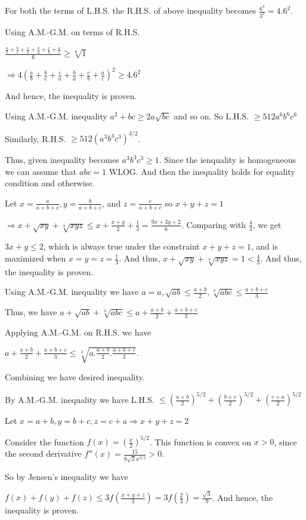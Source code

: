  For both the terms of L.H.S. the R.H.S. of above inequality becomes $\frac{6^4}{3^2} = 4.6^2$.

  Using A.M.-G.M. on terms of R.H.S.

  $\displaystyle \frac{\frac{a}{b} + \frac{b}{c} + \frac{c}{a} + \frac{b}{a} + \frac{c}{b}
    + \frac{a}{c}}{6}\geq \sqrt[6]{1}$

  $\Rightarrow 4\left(\frac{a}{b} + \frac{b}{c} + \frac{c}{a} + \frac{b}{a} + \frac{c}{b}
  + \frac{a}{c}\right)^2\geq 4.6^2$

  And hence, the inequality is proven.
\item Using A.M.-G.M. inequality $a^2 + bc\geq 2a\sqrt{bc}$ and so on. So L.H.S. $\geq512a^6b^6c^6$

  Similarly, R.H.S. $\geq 512 (a^3b^3c^3)^{3/2}$.

  Thus, given inequality becomes $a^3b^3c^3\geq 1$. Since the ienquality is homogeneous we can assume that
  $abc = 1$ WLOG. And then the inequality holds for equality condition and otherwise.
\item Let $x = \frac{a}{a+ b + c}, y = \frac{b}{a + b + c}$, and $z = \frac{c}{a + b + c}$ so $x + y + z =
  1$

  $\Rightarrow x + \sqrt{xy} + \sqrt[3]{xyz} \leq x + \frac{x + y}{2} + \frac{1}{3} = \frac{9x + 3y +
    2}{6}$. Comparing with $\frac{4}{3}$, we get

  $3x + y\leq 2$, which is always true under the constraint $x + y + z = 1$, and is maximized when $x = y =
  z = \frac{1}{3}$. And thus, $x + \sqrt{xy} + \sqrt[3]{xyz} = 1 < \frac{4}{3}$. And thus, the inequality is
  proven.
\item Using A.M.-G.M. inequality we have $a = a, \sqrt{ab}\leq \frac{a + b}{2}, \sqrt[3]{abc}\leq \frac{a +
  b + c}{3}$

  Thus, we have $a + \sqrt{ab} + \sqrt[3]{abc}\leq a + \frac{a + b}{2} + \frac{a + b + c}{3}$

  Applying A.M.-G.M. on R.H.S. we have

  $a + \frac{a + b}{2} + \frac{a + b + c}{3}\leq \sqrt[3]{a.\frac{a + b}{2}.\frac{a + b + c}{3}}$.

  Combining we have desired inequality.
\item By A.M.-G.M. inequality we have L.H.S. $\leq \left(\frac{a + b}{2}\right)^{5/2} + \left(\frac{b +
  c}{2}\right)^{5/2} + \left(\frac{c + a}{2}\right)^{5/2}$

  Let $x = a + b, y = b + c, z = c + a\Rightarrow x + y + z = 2$

  Consider the function $f(x) = \left(\frac{x}{2}\right)^{5/2}$. This function is convex on $x > 0$, since
  the second derivative $f''(x) = \frac{15}{8\sqrt{2}x^{3/2}}> 0$.

  So by Jensen's inequality we have

  $f(x) + f(y) + f(z)\leq 3f\left(\frac{x + y + z}{3}\right) = 3f\left(\frac{2}{3}\right)
  = \frac{\sqrt{3}}{9}$. And hence, the inequality is proven.
\stopitemize
